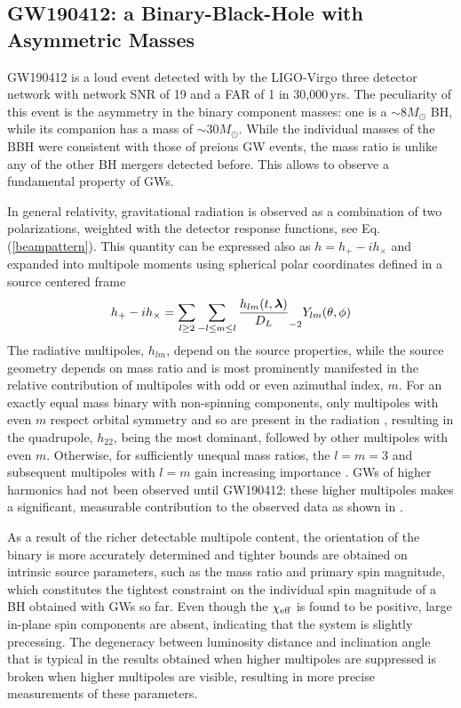 \documentclass[binding=0.6cm, LaM]{sapthesis}
\begin{document}
\subsection{GW190412: a Binary-Black-Hole with Asymmetric Masses}
	GW190412 is a loud event detected with by the LIGO-Virgo three detector network 
	with network SNR of 19 and a FAR of 1 in 30,000\,yrs.
	The peculiarity of this event is the asymmetry in the binary component masses:
	one is a $\sim 8M_\odot$ BH, while its companion has a mass of $\sim 30M_\odot$.
	While the individual masses of the BBH were consistent with those of preious GW events,
	the mass ratio is unlike any of the other BH mergers detected before. 
	This allows to observe a fundamental property of GWs.

	In general relativity, gravitational radiation
	is observed as a combination of two polarizations, weighted with the detector response functions, see Eq.\,(\ref{beampattern}). 
	This quantity can be expressed also as $h = h_{+}-ih_{\times}$ and expanded into multipole moments 
	using spherical polar coordinates defined in a source centered frame \cite{225}
        \begin{equation}
          h_{+}-ih_{\times} = \sum_{l \geq 2} \sum_{-l \leq m \leq l} {{h_{lm}(t, \boldsymbol{\lambda})} \over {D_L}} _{-2} Y_{lm}(\theta, \phi)
        \end{equation}
	The radiative multipoles, $h_{lm}$, depend on the source properties, while the source geometry 
	depends on mass ratio and is most prominently manifested in the relative contribution 
	of multipoles with odd or even azimuthal index, $m$.
	For an exactly equal mass binary with non-spinning components, only multipoles with even $m$ 
	respect orbital symmetry and so are present in the radiation \cite{187}, resulting in the quadrupole, $h_{22}$, 
	being the most dominant, followed by other multipoles with even $m$. 
	Otherwise, for sufficiently unequal mass ratios, the $l = m = 3$ and subsequent 
	multipoles with $l = m$ gain increasing importance \cite{187-192}.
	GWs of higher harmonics had not been observed until GW190412:
	these higher multipoles makes a significant, measurable contribution to the observed data as shown in \cite{133}.

	As a result of the richer detectable multipole content, 
	the orientation of the binary is more accurately determined and 
	tighter bounds are obtained on intrinsic source parameters, 
	such as the mass ratio and primary spin magnitude, 
	which constitutes the tightest constraint on the individual spin magnitude of a BH obtained with GWs so far. 
	Even though the $\chi_{\rm eff}$ is found to be positive, 
	large in-plane spin components are absent, 
	indicating that the system is slightly precessing.
	The degeneracy between luminosity distance and inclination angle that is typical 
	in the results obtained when higher multipoles are suppressed is broken when higher multipoles are visible, 
	resulting in more precise measurements of these parameters.
\end{document}
